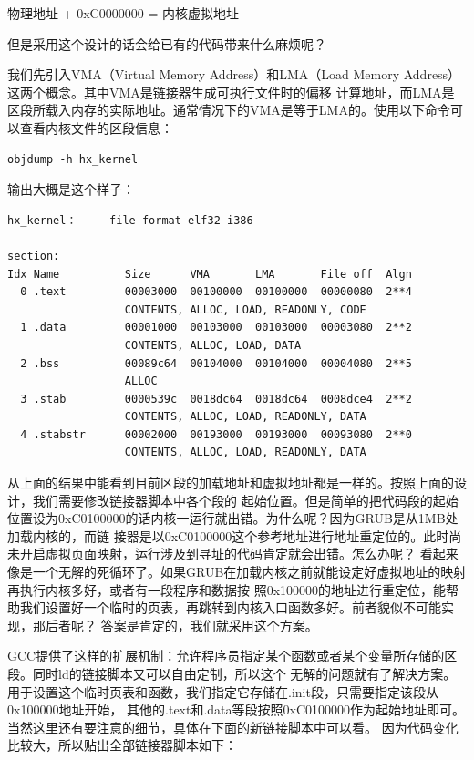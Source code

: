 \par 物理地址 + 0xC0000000 = 内核虚拟地址

\par 但是采用这个设计的话会给已有的代码带来什么麻烦呢？

\par 我们先引入VMA（Virtual Memory Address）和LMA（Load Memory Address）这两个概念。其中VMA是链接器生成可执行文件时的偏移\allowbreak
计算地址，而LMA是区段所载入内存的实际地址。通常情况下的VMA是等于LMA的。使用以下命令可以查看内核文件的区段信息：
\begin{Verbatim}[frame=single]
    objdump -h hx_kernel
\end{Verbatim}

\par 输出大概是这个样子：

\begin{Verbatim}[frame=single]
hx_kernel：     file format elf32-i386

section:
Idx Name          Size      VMA       LMA       File off  Algn
  0 .text         00003000  00100000  00100000  00000080  2**4
                  CONTENTS, ALLOC, LOAD, READONLY, CODE
  1 .data         00001000  00103000  00103000  00003080  2**2
                  CONTENTS, ALLOC, LOAD, DATA
  2 .bss          00089c64  00104000  00104000  00004080  2**5
                  ALLOC
  3 .stab         0000539c  0018dc64  0018dc64  0008dce4  2**2
                  CONTENTS, ALLOC, LOAD, READONLY, DATA
  4 .stabstr      00002000  00193000  00193000  00093080  2**0
                  CONTENTS, ALLOC, LOAD, READONLY, DATA
\end{Verbatim}

\par 从上面的结果中能看到目前区段的加载地址和虚拟地址都是一样的。按照上面的设计，我们需要修改链接器脚本中各个段的\allowbreak
起始位置。但是简单的把代码段的起始位置设为0xC0100000的话内核一运行就出错。为什么呢？因为GRUB是从1MB处加载内核的，而链\allowbreak
接器是以0xC0100000这个参考地址进行地址重定位的。此时尚未开启虚拟页面映射，运行涉及到寻址的代码肯定就会出错。怎么办呢？\allowbreak
看起来像是一个无解的死循环了。如果GRUB在加载内核之前就能设定好虚拟地址的映射再执行内核多好，或者有一段程序和数据按\allowbreak
照0x100000的地址进行重定位，能帮助我们设置好一个临时的页表，再跳转到内核入口函数多好。前者貌似不可能实现，那后者呢？\allowbreak
答案是肯定的，我们就采用这个方案。

\par GCC提供了这样的扩展机制：允许程序员指定某个函数或者某个变量所存储的区段。同时ld的链接脚本又可以自由定制，所以这个\allowbreak
无解的问题就有了解决方案。用于设置这个临时页表和函数，我们指定它存储在.init段，只需要指定该段从0x100000地址开始，\allowbreak
其他的.text和.data等段按照0xC0100000作为起始地址即可。当然这里还有要注意的细节，具体在下面的新链接脚本中可以看。\allowbreak
因为代码变化比较大，所以贴出全部链接器脚本如下：


